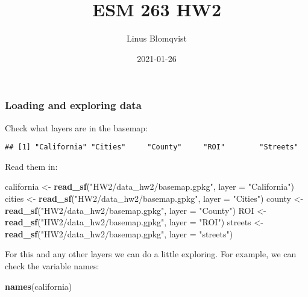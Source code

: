 \documentclass[
]{article}
\title{ESM 263 HW2}
\author{Linus Blomqvist}
\date{2021-01-26}
\newenvironment{Shaded}{\begin{snugshade}}{\end{snugshade}}
\newcommand{\DataTypeTok}[1]{\textcolor[rgb]{0.13,0.29,0.53}{#1}}
\newcommand{\KeywordTok}[1]{\textcolor[rgb]{0.13,0.29,0.53}{\textbf{#1}}}
\newcommand{\NormalTok}[1]{#1}
\newcommand{\OperatorTok}[1]{\textcolor[rgb]{0.81,0.36,0.00}{\textbf{#1}}}
\newcommand{\StringTok}[1]{\textcolor[rgb]{0.31,0.60,0.02}{#1}}
\begin{document}
\maketitle

\hypertarget{loading-and-exploring-data}{%
\subsubsection{Loading and exploring
data}\label{loading-and-exploring-data}}

Check what layers are in the basemap:

\begin{Shaded}
\end{Shaded}

\begin{verbatim}
## [1] "California" "Cities"     "County"     "ROI"        "Streets"
\end{verbatim}

Read them in:

\begin{Shaded}
\begin{Highlighting}[]
\NormalTok{california <-}\StringTok{ }\KeywordTok{read_sf}\NormalTok{(}\StringTok{"HW2/data_hw2/basemap.gpkg"}\NormalTok{, }\DataTypeTok{layer =} \StringTok{"California"}\NormalTok{)}
\NormalTok{cities <-}\StringTok{ }\KeywordTok{read_sf}\NormalTok{(}\StringTok{"HW2/data_hw2/basemap.gpkg"}\NormalTok{, }\DataTypeTok{layer =} \StringTok{"Cities"}\NormalTok{)}
\NormalTok{county <-}\StringTok{ }\KeywordTok{read_sf}\NormalTok{(}\StringTok{"HW2/data_hw2/basemap.gpkg"}\NormalTok{, }\DataTypeTok{layer =} \StringTok{"County"}\NormalTok{)}
\NormalTok{ROI <-}\StringTok{ }\KeywordTok{read_sf}\NormalTok{(}\StringTok{"HW2/data_hw2/basemap.gpkg"}\NormalTok{, }\DataTypeTok{layer =} \StringTok{"ROI"}\NormalTok{)}
\NormalTok{streets <-}\StringTok{ }\KeywordTok{read_sf}\NormalTok{(}\StringTok{"HW2/data_hw2/basemap.gpkg"}\NormalTok{, }\DataTypeTok{layer =} \StringTok{"streets"}\NormalTok{)}
\end{Highlighting}
\end{Shaded}

For this and any other layers we can do a little exploring. For example,
we can check the variable names:

\begin{Shaded}
\begin{Highlighting}[]
\KeywordTok{names}\NormalTok{(california)}
\end{Highlighting}
\end{Shaded}
\end{document}
